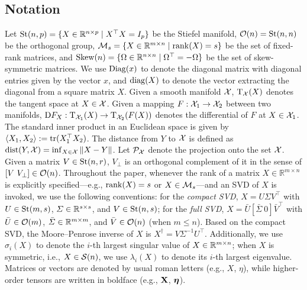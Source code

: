 \subsection{Notation} 
Let $\mathrm{St}(n, p)=\{X \in \mathbb{R}^{n \times p}\mid X^{\top} X=I_p\}$ be {the} Stiefel manifold, $\mathcal{O}(n)=\mathrm{St}(n,n)$ be the orthogonal group, $\mathcal{M}_{s}=\{X\in \mathbb{R}^{m\times n}\mid \operatorname{rank}(X)=s\}$ be the set of fixed-rank matrices, and $\mathrm{Skew}(n)=\{\Omega\in\mathbb{R}^{n\times n}\mid \Omega^\top=-\Omega\}$ be the set of skew-symmetric matrices. We use $\operatorname{Diag}(x)$ to denote the diagonal matrix with diagonal entries given by the vector $x$, and $\operatorname{diag}(X)$ to denote the vector extracting the diagonal from a square matrix $X$. Given a smooth manifold $\mathcal{X}$, $\mathrm{T}_{\mathcal{X}}(X)$ denotes the tangent space at $X\in\mathcal{X}$. Given a mapping $F:\mathcal{X}_1 \to \mathcal{X}_2$ between two manifolds, $\mathrm{D} F_{X}: \mathrm{T}_{\mathcal{X}_1}(X) \to \mathrm{T}_{\mathcal{X}_2}(F(X))$ denotes the differential of $F$ at $X\in\mathcal{X}_1$. The standard inner product in an Euclidean space is given by $\langle {X_1,X_2} \rangle:=\mathrm{tr}(X_1^\top X_2)$. The distance from $Y$ to $\mathcal{X}$ is defined as $\operatorname{dist}(Y,\mathcal{X})=\inf_{X\in\mathcal{X}}\|X-Y\|$. Let $\mathcal{P}_{\mathcal{X}} $ denote the projection onto the set $\mathcal{X}$.  Given a matrix $V\in\mathrm{St}(n,r)$, $V_{\bot}$ is an orthogonal complement of it in the sense of $[V\ V_\bot]\in\mathcal{O}(n)$. Throughout the paper, whenever the rank of a matrix $X\in\mathbb{R}^{m\times n}$ is explicitly specified---e.g., $\operatorname{rank}(X)=s$ or $X\in\mathcal{M}_{s}$---and an SVD of $X$ is invoked, we use the following conventions: for the \emph{compact SVD}, $X= U\varSigma V^\top$ with $U\in\mathrm{St}(m,s)$, $\varSigma\in\mathbb{R}^{s\times s}$, and $V\in\mathrm{St}(n,s)$; for the \emph{full SVD}, $X=\bar{U}[\bar{\varSigma}\ 0]\bar{V}^\top$ with $\bar U\in\mathcal{O}(m)$, $\bar{\varSigma}\in\mathbb{R}^{m\times m}$, and $\bar V\in\mathcal{O}(n)$ (when $m\le n$). Based on the compact SVD, the Moore--Penrose inverse of $X$ is $X^\dagger=V\varSigma^{-1} U^\top$. Additionally, we use $\sigma_i(X)$ to denote the $i$-th {largest} singular value of $X\in\mathbb{R}^{m\times n}$; when $X$ is symmetric, i.e., $X\in\mathcal{S}(n)$,  we use $\lambda_i(X)$ to denote its $i$-th {largest} eigenvalue. Matrices or vectors are denoted by usual roman letters (e.g., $X$, $\eta$), while higher-order tensors are written in boldface (e.g., $\mathbf{X}$, $\bm{\eta}$). 


